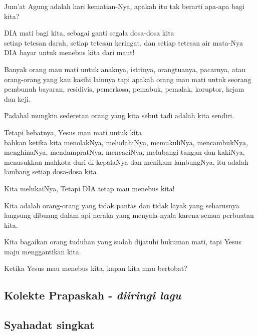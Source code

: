 \documentclass[a5paper,headsepline,titlepage,11pt,nnormalheadings,DIVcalc]{scrbook}
\begin{document}
Jum'at Agung adalah hari kematian-Nya, apakah itu tak berarti apa-apa bagi kita?

DIA mati bagi kita, sebagai ganti segala dosa-dosa kita\\
setiap tetesan darah, setiap tetesan keringat, dan setiap tetesan air mata-Nya\\
DIA bayar untuk menebus kita dari maut!

Banyak orang mau mati untuk anaknya, istrinya, orangtuanya, pacarnya,
atau orang-orang yang kau kasihi lainnya
tapi apakah orang mau mati untuk 
seorang pembunuh bayaran, residivis, pemerkosa,
pemabuk, pemalak, koruptor, kejam dan keji.

Padahal mungkin sederetan orang yang kita sebut tadi 
adalah kita sendiri.

Tetapi hebatnya, Yesus mau mati untuk kita\\
bahkan ketika kita menolakNya, 
meludahiNya, memukuliNya, mencambukNya,
menghinaNya, mendampratNya, mencaciNya,
melubangi tangan dan kakiNya,
menusukkan mahkota duri di kepalaNya
dan menikam lambungNya,
itu adalah lambang setiap dosa-dosa kita

Kita melukaiNya, Tetapi DIA tetap mau menebus kita!

Kita adalah orang-orang yang tidak pantas dan tidak layak
yang seharusnya langsung dibuang dalam api neraka
yang menyala-nyala
karena semua perbuatan kita.

Kita bagaikan orang tuduhan
yang sudah dijatuhi hukuman mati,
tapi Yesus maju menggantikan kita.

Ketika Yesus mau menebus kita, kapan kita mau bertobat?

\subsection*{Kolekte Prapaskah - \emph{diiringi lagu}}
\subsection*{Syahadat singkat}
\end{document}
